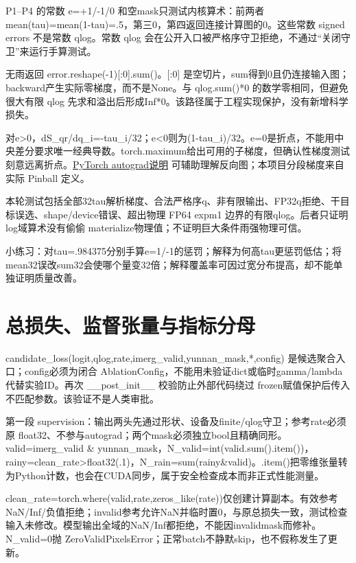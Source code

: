 \documentclass[UTF8,fontset=fandol,10pt]{ctexart}
\begin{document}
P1–P4 的常数 e=+1/\allowbreak{}-1/\allowbreak{}0 和空mask只测试内核算术：前两者 mean(tau)=mean(1-tau)=.5，第三0，第四返回连接计算图的0。这些常数 signed errors 不是常数 qlog。常数 qlog 会在公开入口被严格序守卫拒绝，不通过“关闭守卫”来运行手算测试。

无雨返回 error.reshape(-1)[:0].sum()。[:0] 是空切片，sum得到0且仍连接输入图；backward产生实际零梯度，而不是None。与 qlog.sum()*0 的数学零相同，但避免很大有限 qlog 先求和溢出后形成Inf*0。该路径属于工程实现保护，没有新增科学损失。

对e>0，dS\_\allowbreak{}qr/\allowbreak{}dq\_\allowbreak{}i=-tau\_\allowbreak{}i/\allowbreak{}32；e<0则为(1-tau\_\allowbreak{}i)/\allowbreak{}32。e=0是折点，不能用中央差分要求唯一经典导数。torch.maximum给出可用的子梯度，但确认性梯度测试刻意远离折点。\href{https://docs.pytorch.org/docs/2.7/notes/autograd.html}{PyTorch autograd说明} 可辅助理解反向图；本项目分段梯度来自实际 Pinball 定义。

本轮测试包括全部32tau解析梯度、合法严格序q、非有限输出、FP32q拒绝、干目标误选、shape/\allowbreak{}device错误、超出物理 FP64 expm1 边界的有限qlog。后者只证明 log域算术没有偷偷 materialize物理值；不证明巨大条件雨强物理可信。

小练习：对tau=.984375分别手算e=1/\allowbreak{}-1的惩罚；解释为何高tau更惩罚低估；将mean32误改sum32会使哪个量变32倍；解释覆盖率可因过宽分布提高，却不能单独证明质量改善。
\clearpage\section{总损失、监督张量与指标分母}

candidate\_\allowbreak{}loss(logit,qlog,rate,imerg\_\allowbreak{}valid,yunnan\_\allowbreak{}mask,*,config) 是候选聚合入口；config必须为闭合 AblationConfig，不能用未验证dict或临时gamma/\allowbreak{}lambda代替实验ID。再次 \_\allowbreak{}\_\allowbreak{}post\_\allowbreak{}init\_\allowbreak{}\_\allowbreak{} 校验防止外部代码绕过 frozen赋值保护后传入不匹配参数。该验证不是人类审批。

第一段 supervision：输出两头先通过形状、设备及finite/\allowbreak{}qlog守卫；参考rate必须原 float32、不参与autograd；两个mask必须独立bool且精确同形。valid=imerg\_\allowbreak{}valid \& yunnan\_\allowbreak{}mask，N\_\allowbreak{}valid=int(valid.sum().item())，rainy=clean\_\allowbreak{}rate>float32(.1)，N\_\allowbreak{}rain=sum(rainy\&valid)。.item()把零维张量转为Python计数，也会在CUDA同步，属于安全检查成本而非正式性能测量。

clean\_\allowbreak{}rate=torch.where(valid,rate,zeros\_\allowbreak{}like(rate))仅创建计算副本。有效参考NaN/\allowbreak{}Inf/\allowbreak{}负值拒绝；invalid参考允许NaN并临时置0，与原总损失一致，测试检查输入未修改。模型输出全域的NaN/\allowbreak{}Inf都拒绝，不能因invalidmask而修补。N\_\allowbreak{}valid=0抛 ZeroValidPixelsError；正常batch不静默skip，也不假称发生了更新。
\end{document}

